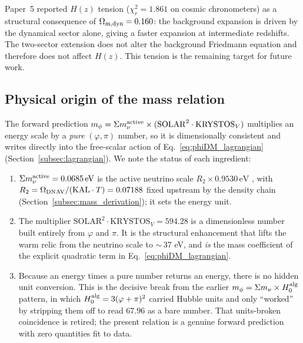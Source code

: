 \documentclass[12pt,a4paper]{article}
\newcommand{\mphi}{m_\phi}
\newcommand{\mnu}{\Sigma m_\nu}
\newcommand{\Halg}{H_0^{\rm alg}}
\newcommand{\KAL}{\mathrm{KAL}}
\begin{document}
Paper~5 reported $H(z)$ tension ($\chi^2_r = 1.861$ on cosmic chronometers) as a
structural consequence of $\Omega_{\rm m,dyn} = 0.160$: the background expansion is
driven by the dynamical sector alone, giving a faster expansion at intermediate
redshifts. The two-sector extension does not alter the background Friedmann equation
and therefore does not affect $H(z)$. This tension is the remaining target for
future work.

\subsection{Physical origin of the mass relation}
\label{subsec:origin}

The forward prediction $\mphi = \mnu^{\rm active}\times(\mathrm{SOLAR}^2\cdot\mathrm{KRYSTOS}_V)$
multiplies an energy scale by a \emph{pure} $(\varphi,\pi)$ number, so it is
dimensionally consistent and writes directly into the free-scalar action of
Eq.~\eqref{eq:phiDM_lagrangian} (Section~\ref{subsec:lagrangian}). We note the
status of each ingredient:

\begin{enumerate}
  \item $\mnu^{\rm active} = 0.0685\,\mathrm{eV}$ is the active neutrino scale
    $R_2\times0.9530\,\mathrm{eV}$ \citep{Lesgourgues2006}, with
    $R_2=\Omega_{\rm DNAV}/(\KAL\cdot T)=0.07188$ fixed upstream by the density
    chain (Section~\ref{subsec:mass_derivation}); it sets the energy unit.
  \item The multiplier $\mathrm{SOLAR}^2\cdot\mathrm{KRYSTOS}_V = 594.28$ is a
    dimensionless number built entirely from $\varphi$ and $\pi$. It is the
    structural enhancement that lifts the warm relic from the neutrino scale to
    $\sim$\,37 eV, and \emph{is} the mass coefficient of the explicit quadratic
    term in Eq.~\eqref{eq:phiDM_lagrangian}.
  \item Because an energy times a pure number returns an energy, there is no
    hidden unit conversion. This is the decisive break from the earlier
    $\mphi=\mnu\times\Halg$ pattern, in which $\Halg=3(\varphi+\pi)^2$ carried
    Hubble units and only ``worked'' by stripping them off to read $67.96$ as a
    bare number. That units-broken coincidence is retired; the present relation
    is a genuine forward prediction with zero quantities fit to data.
\end{enumerate}
\end{document}
